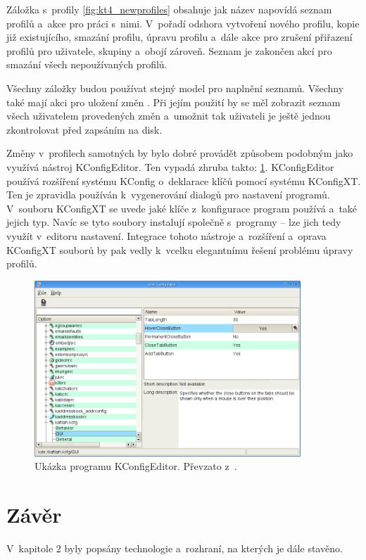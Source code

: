 Záložka s~profily \ref{fig:kt4_newprofiles} obsahuje jak název napovídá seznam profilů a~akce pro práci s~nimi. V~pořadí odshora vytvoření nového profilu, kopie již existujícího, smazání profilu, úpravu profilu a~dále akce pro zrušení přiřazení profilů pro uživatele, skupiny a~obojí zároveň. Seznam je zakončen akcí pro smazání všech nepoužívaných profilů.

Všechny záložky budou používat stejný model pro naplnění seznamů. Všechny také mají akci pro uložení změn . Při jejím použití by se měl zobrazit seznam všech uživatelem provedených změn a~umožnit tak uživateli je ještě jednou zkontrolovat před zapsáním na disk.

Změny v~profilech samotných by bylo dobré provádět způsobem podobným jako využívá nástroj KConfigEditor. Ten vypadá zhruba takto: \ref{fig:kconfeditor}. KConfigEditor používá rozšíření systému KConfig o~deklarace klíčů pomocí systému KConfigXT. Ten je zpravidla používán k~vygenerování dialogů pro nastavení programů. V~souboru KConfigXT se uvede jaké klíče z~konfigurace program používá a~také jejich typ. Navíc se tyto soubory instalují společně s~programy -- lze jich tedy využít v~editoru nastavení. Integrace tohoto nástroje a~rozšíření a~oprava KConfigXT souborů by pak vedly k~vcelku elegantnímu řešení problému úpravy profilů.

\begin{figure}[h]
    \centering
    \includegraphics[width=10cm]{obrazky/kconfigeditor1.png}
    \caption{Ukázka programu KConfigEditor. Převzato z~\cite{KConfigEditor}.}
    \label{fig:kconfeditor}
\end{figure}

\chapter{Závěr}
V~kapitole 2 byly popsány technologie a~rozhraní, na kterých je dále stavěno.

